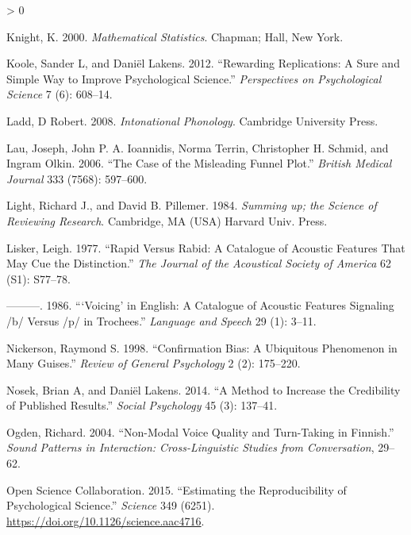 \documentclass[
  12pt,
]{article}
\newlength{\cslhangindent}
\newenvironment{CSLReferences}[2] %
 {%
  \setlength{\parindent}{0pt}
  \ifodd #1 \everypar{\setlength{\hangindent}{\cslhangindent}}\ignorespaces\fi
  \ifnum #2 > 0
  \setlength{\parskip}{#2\baselineskip}
  \fi
 }%
 {}
\begin{document}
\begin{CSLReferences}{1}{0}
\leavevmode\hypertarget{ref-knight2000}{}%
Knight, K. 2000. \emph{Mathematical Statistics}. Chapman; Hall, New York.

\leavevmode\hypertarget{ref-koole2012rewarding}{}%
Koole, Sander L, and Daniël Lakens. 2012. {``Rewarding Replications: A Sure and Simple Way to Improve Psychological Science.''} \emph{Perspectives on Psychological Science} 7 (6): 608--14.

\leavevmode\hypertarget{ref-ladd2008intonational}{}%
Ladd, D Robert. 2008. \emph{Intonational Phonology}. Cambridge University Press.

\leavevmode\hypertarget{ref-lau2006}{}%
Lau, Joseph, John P. A. Ioannidis, Norma Terrin, Christopher H. Schmid, and Ingram Olkin. 2006. {``The Case of the Misleading Funnel Plot.''} \emph{British Medical Journal} 333 (7568): 597--600.

\leavevmode\hypertarget{ref-light1984}{}%
Light, Richard J., and David B. Pillemer. 1984. \emph{Summing up; the Science of Reviewing Research}. Cambridge, MA (USA) Harvard Univ. Press.

\leavevmode\hypertarget{ref-lisker1977rapid}{}%
Lisker, Leigh. 1977. {``Rapid Versus Rabid: A Catalogue of Acoustic Features That May Cue the Distinction.''} \emph{The Journal of the Acoustical Society of America} 62 (S1): S77--78.

\leavevmode\hypertarget{ref-lisker1986voicing}{}%
---------. 1986. {``{`Voicing'} in {E}nglish: A Catalogue of Acoustic Features Signaling /b/ Versus /p/ in Trochees.''} \emph{Language and Speech} 29 (1): 3--11.

\leavevmode\hypertarget{ref-nickerson1998confirmation}{}%
Nickerson, Raymond S. 1998. {``Confirmation Bias: A Ubiquitous Phenomenon in Many Guises.''} \emph{Review of General Psychology} 2 (2): 175--220.

\leavevmode\hypertarget{ref-nosek2014method}{}%
Nosek, Brian A, and Daniël Lakens. 2014. {``A Method to Increase the Credibility of Published Results.''} \emph{Social Psychology} 45 (3): 137--41.

\leavevmode\hypertarget{ref-ogden2004}{}%
Ogden, Richard. 2004. {``Non-Modal Voice Quality and Turn-Taking in {F}innish.''} \emph{Sound Patterns in Interaction: Cross-Linguistic Studies from Conversation}, 29--62.

\leavevmode\hypertarget{ref-open2015estimating}{}%
Open Science Collaboration. 2015. {``Estimating the Reproducibility of Psychological Science.''} \emph{Science} 349 (6251). \url{https://doi.org/10.1126/science.aac4716}.


\end{CSLReferences}
\end{document}
